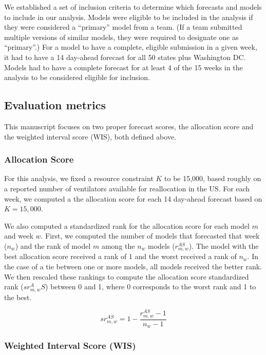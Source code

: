 \documentclass{article}\usepackage[]{graphicx}\usepackage[]{xcolor}
\begin{document}
We established a set of inclusion criteria to determine which forecasts and models to include in our analysis.
Models were eligible to be included in the analysis if they were considered a ``primary'' model from a team. (If a team submitted multiple versions of similar models, they were required to designate one as ``primary''.)
For a model to have a complete, eligible submission in a given week, it had to have a 14 day-ahead forecast for all 50 states plus Washington DC.
Models had to have a complete forecast for at least 4 of the 15 weeks in the analysis to be considered eligible for inclusion.

\subsection{Evaluation metrics}

This manuscript focuses on two proper forecast scores, the allocation score and the weighted interval score (WIS), both defined above.

\subsubsection{Allocation Score}

For this analysis, we fixed a resource constraint $K$ to be 15,000, based roughly on a reported number of ventilators available for reallocation in the US.\citep{ajao_assessing_2015}
For each week, we computed a the allocation score for each 14 day-ahead forecast based on $K=15,000$.

We also computed a standardized rank for the allocation score for each model $m$ and week $w$.
First, we computed the number of models that forecasted that week ($n_w$) and the rank of model $m$ among the $n_w$ models ($r_{m,w}^{AS}$).
The model with the best allocation score received a rank of 1 and the worst received a rank of $n_w$.
In the case of a tie between one or more models, all models received the better rank.
We then rescaled these rankings to compute the allocation score standardized rank ($sr_{m,w}^AS$) between 0 and 1, where 0 corresponds to the worst rank and 1 to the best.


\begin{equation}
sr_{m,w}^{AS} = 1 - \frac{r^{AS}_{m,w}-1}{n_w-1}
\end{equation}

\subsubsection{Weighted Interval Score (WIS)}
\end{document}
